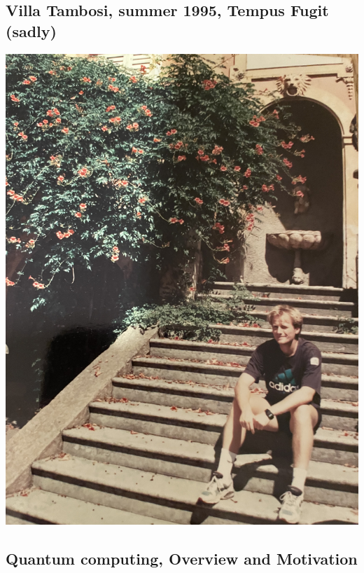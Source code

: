\documentclass[%
oneside,                 %
final,                   %
10pt]{article}
\begin{document}
\subsection{Villa Tambosi, summer 1995, Tempus Fugit (sadly)}

\vspace{6mm}

\centerline{\includegraphics[width=0.8\linewidth]{Photos/mhj1995.jpeg}}

\vspace{6mm}

\subsection{Quantum computing, Overview and Motivation}
\end{document}

